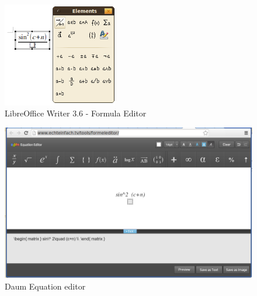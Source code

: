 \documentclass[a4paper]{scrartcl}
\begin{document}
    \begin{figure}[h]
        \centering
        \includegraphics*[width=5cm, keepaspectratio]{figures/libreoffice-writer.png}
        \caption{LibreOffice Writer 3.6 - Formula Editor}
        \label{fig:libre-office-3.6}
    \end{figure}

    \begin{figure}[h]
        \centering
        \includegraphics*[width=15cm, keepaspectratio]{figures/daum-editor.png}
        \caption{Daum Equation editor}
        \label{fig:daum-editor}
    \end{figure}
\break
\end{document}
